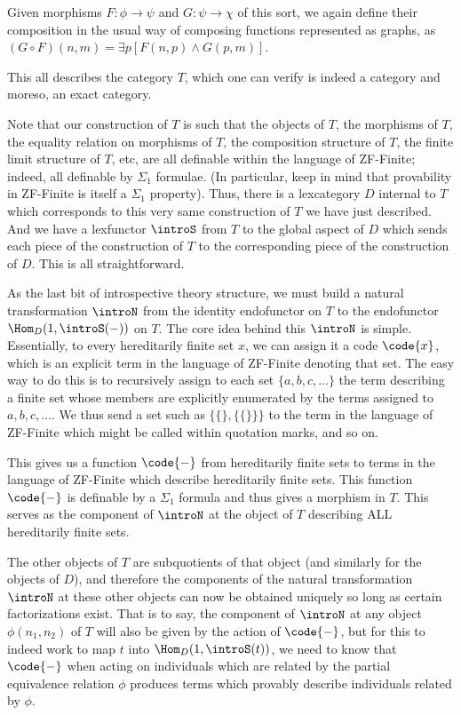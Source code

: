 Given morphisms $F : \phi \to \psi$ and $G: \psi \to \chi$ of this sort, we again define their composition in the usual way of composing functions represented as graphs, as $(G \circ F)(n, m) = \exists p [F(n, p) \wedge G(p, m)]$.

This all describes the category $T$, which one can verify is indeed a category and moreso, an exact category.

Note that our construction of $T$ is such that the objects of $T$, the morphisms of $T$, the equality relation on morphisms of $T$, the composition structure of $T$, the finite limit structure of $T$, etc, are all definable within the language of ZF-Finite; indeed, all definable by $\Sigma_1$ formulae. (In particular, keep in mind that provability in ZF-Finite is itself a $\Sigma_1$ property). Thus, there is a lexcategory $D$ internal to $T$ which corresponds to this very same construction of $T$ we have just described. And we have a lexfunctor $\introS$ from $T$ to the global aspect of $D$ which sends each piece of the construction of $T$ to the corresponding piece of the construction of $D$. This is all straightforward.

As the last bit of introspective theory structure, we must build a natural transformation $\introN$ from the identity endofunctor on $T$ to the endofunctor $\Hom_D(1, \introS(-))$ on $T$. The core idea behind this $\introN$ is simple. Essentially, to every hereditarily finite set $x$, we can assign it a code $\code{x}$, which is an explicit term in the language of ZF-Finite denoting that set. The easy way to do this is to recursively assign to each set $\{a, b, c, \ldots\}$ the term describing a finite set whose members are explicitly enumerated by the terms assigned to $a, b, c, \ldots$. We thus send a set such as $\{\{\}, \{\{\}\}\}$ to the term in the language of ZF-Finite which might be called \quote{$\{\{\}, \{\{\}\}\}$} within quotation marks, and so on. 

This gives us a function $\code{-}$ from hereditarily finite sets to terms in the language of ZF-Finite which describe hereditarily finite sets. This function $\code{-}$ is definable by a $\Sigma_1$ formula and thus gives a morphism in $T$. This serves as the component of $\introN$ at the object of $T$ describing ALL hereditarily finite sets. 

The other objects of $T$ are subquotients of that object (and similarly for the objects of $D$), and therefore the components of the natural transformation $\introN$ at these other objects can now be obtained uniquely so long as certain factorizations exist. That is to say, the component of $\introN$ at any object $\phi(n_1, n_2)$ of $T$ will also be given by the action of $\code{-}$, but for this to indeed work to map $t$ into $\Hom_D(1, \introS(t))$, we need to know that $\code{-}$ when acting on individuals which are related by the partial equivalence relation $\phi$ produces terms which provably describe individuals related by $\phi$.

